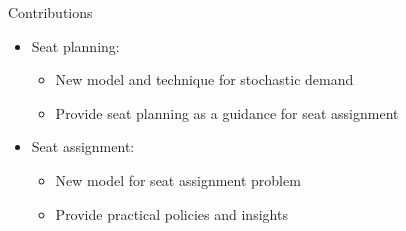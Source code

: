     \begin{frame}{Contributions}
      \begin{itemize}
        \item  Seat planning:
        \vspace{0.2cm}

        \begin{itemize}
          \item New model and technique for stochastic demand
          \vspace{0.2cm}

          \item Provide seat planning as a guidance for seat assignment 
        \end{itemize}
        
        \vspace{0.8cm}
        
        \item Seat assignment:
        \vspace{0.2cm}

        \begin{itemize}
          \item New model for seat assignment problem
          \vspace{0.2cm}

          \item Provide practical policies and insights
        \end{itemize}
      
      \end{itemize}  

    \end{frame}
